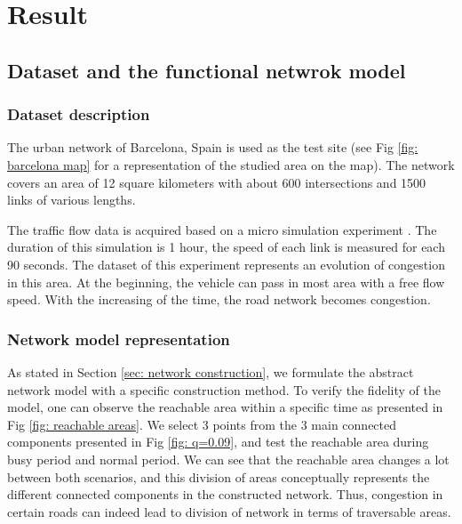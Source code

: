 \section{Result} \label{sec: result}


\subsection{Dataset and the functional netwrok model}

\subsubsection{Dataset description}
The urban network of Barcelona, Spain is used as the test site (see Fig \ref{fig: barcelona map} for a representation of the studied area on the map). The network covers an area of 12 square kilometers with about 600 intersections and 1500 links of various lengths.

The traffic flow data is acquired based on a micro simulation experiment \cite{kouvelas2017enhancing}. The duration of this simulation is 1 hour, the speed of each link is measured for each 90 seconds. The dataset of this experiment represents an evolution of congestion in this area. At the beginning, the vehicle can pass in most area with a free flow speed. With the increasing of the time, the road network becomes congestion.

\subsubsection{Network model representation}
As stated in Section \ref{sec: network construction}, we formulate the abstract network model with a specific construction method. To verify the fidelity of the model, one can observe the reachable area within a specific time as presented in Fig \ref{fig: reachable areas}. We select 3 points from the 3 main connected components presented in Fig \ref{fig: q=0.09}, and test the reachable area during busy period and normal period. We can see that the reachable area changes a lot between both scenarios, and this division of areas conceptually represents the different connected components in the constructed network. Thus, congestion in certain roads can indeed lead to division of network in terms of traversable areas.


